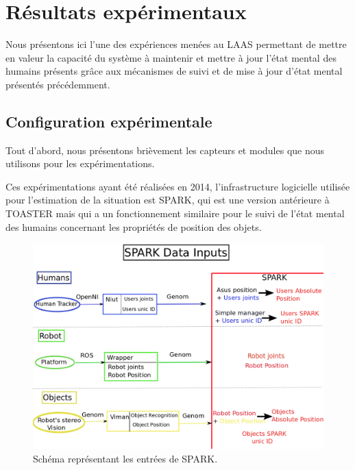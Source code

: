 \documentclass[a4paper,11pt,twoside]{StyleThese}
\begin{document}
\section{Résultats expérimentaux}

Nous présentons ici l'une des expériences menées au LAAS permettant de mettre en valeur la capacité du système à maintenir et mettre à jour l'état mental des humains présents grâce aux mécanismes de suivi et de mise à jour d'état mental présentés précédemment.

\subsection{Configuration expérimentale}
\label{sec:chap2expconf}
Tout d'abord, nous présentons brièvement les capteurs et modules que nous utilisons pour les expérimentations.


Ces expérimentations ayant été réalisées en 2014, l'infrastructure logicielle utilisée pour l'estimation de la situation est SPARK\cite{sisbot2011situation,warnier2012when,Milliez2014}, qui est une version antérieure à TOASTER mais qui a un fonctionnement similaire pour le suivi de l'état mental des humains concernant les propriétés de position des objets.

\begin{figure}[ht!]
  \centering
 \includegraphics[width=0.99\linewidth]{./img/spark_input.png} 
  \caption {Schéma représentant les entrées de SPARK.}
  \label{fig:inputSpark}
\end{figure}
\end{document}
